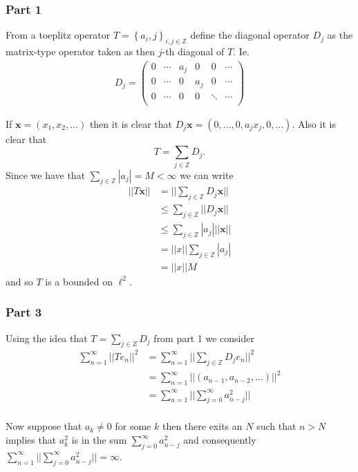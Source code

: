 \documentclass{unswmaths}
\begin{document}
\subsubsection*{Part 1}
From a toeplitz operator $ T = \left\{ a{_i,j} \right\}_{i,j\in\mathbb{Z}} $
define the diagonal operator $ D_j $ as the matrix-type operator taken as then
$ j$-th diagonal of $ T $. Ie.
\begin{align*}
D_j = 
\left(
\begin{matrix}
	0 & \cdots & a_j & 0 & 0 & \cdots \\
	0 & \cdots & 0 & a_j & 0 & \cdots  \\
	0 & \cdots & 0 & 0 & \ddots & \cdots  \\
\end{matrix}
\right)
\end{align*}

If $ \mathbf{x} = (x_1, x_2, \ldots ) $ then it is clear that $ D_j \mathbf{x} = ( 0, \ldots, 0, a_j x_j, 0, \ldots ) $.
Also it is clear that 
$$
	T = \sum_{j \in \mathbb{Z}} D_j.
$$
Since we have that $ \sum_{j \in\mathbb{Z}} |a_j|  = M < \infty $ we can write
\begin{align*}
	||T\mathbf{x}|| &= || \sum_{j \in \mathbb{Z}} D_j \mathbf{x} || \\
		&\leq \sum_{j\in\mathbb{Z}} ||D_j \mathbf{x} || \\
		&\leq \sum_{j \in\mathbb{Z}} |a_j| ||\mathbf{x} || \\
		&= ||x|| \sum_{j \in\mathbb{Z}} |a_j| \\
		&= ||x|| M
\end{align*}
and so $ T $ is a bounded on $ \ell^2 $.

\subsubsection*{Part 3}
Using the idea that $ T = \sum_{j\in Z} D_j$ from part 1 we consider 
\begin{align*}
	\sum_{n=1}^{\infty} ||T e_n ||^2 &= \sum_{n=1}^{\infty} || \sum_{j \in \mathbb{Z}} D_j e_n ||^2 \\
		&= \sum_{n=1}^{\infty} || ( a_{n-1}, a_{n-2}, \ldots ) ||^2 \\
 		&= \sum_{n=1}^{\infty} || \sum_{j=0}^{\infty} a_{n-j}^2 || \\
\end{align*}

Now suppose that $ a_k \neq 0 $ for  some $ k $ then there exits an $ N $ such that $ n > N $
implies that $ a^2_k $ is in the sum $ \sum_{j=0}^{\infty} a_{n-j}^2 $ and consequently 
$ \sum_{n=1}^{\infty} || \sum_{j=0}^{\infty} a_{n-j}^2 || = \infty $.
\end{document}
